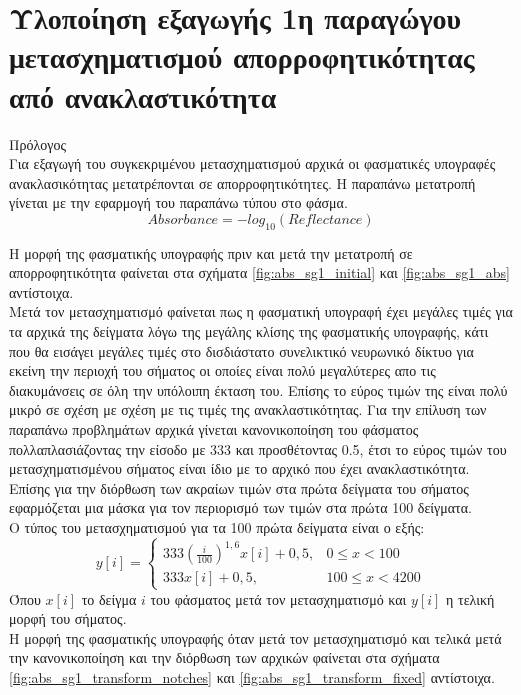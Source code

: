 \section{Υλοποίηση εξαγωγής 1η παραγώγου μετασχηματισμού  απορροφητικότητας από ανακλαστικότητα}
Πρόλογος\\
Για εξαγωγή του συγκεκριμένου μετασχηματισμού αρχικά οι φασματικές υπογραφές ανακλασικότητας μετατρέπονται σε απορροφητικότητες. Η παραπάνω μετατροπή γίνεται με την εφαρμογή του παραπάνω τύπου στο φάσμα.
$$Absorbance=-log_{10}(Reflectance)$$

Η μορφή της φασματικής υπογραφής πριν και μετά την μετατροπή σε απορροφητικότητα φαίνεται στα σχήματα \ref{fig:abs_sg1_initial} και \ref{fig:abs_sg1_abs} αντίστοιχα.\\

Μετά τον μετασχηματισμό  φαίνεται πως η φασματική υπογραφή έχει μεγάλες τιμές για τα αρχικά της δείγματα λόγω της μεγάλης κλίσης της φασματικής υπογραφής, κάτι που θα εισάγει μεγάλες τιμές στο δισδιάστατο συνελικτικό νευρωνικό δίκτυο για εκείνη την περιοχή του σήματος οι οποίες είναι πολύ μεγαλύτερες απο τις διακυμάνσεις σε όλη την υπόλοιπη έκταση του. Επίσης το εύρος τιμών της είναι πολύ μικρό σε σχέση με σχέση με τις τιμές της ανακλαστικότητας. Για την επίλυση των παραπάνω προβλημάτων αρχικά γίνεται κανονικοποίηση του φάσματος πολλαπλασιάζοντας την είσοδο με 333 και προσθέτοντας 0.5, έτσι το εύρος τιμών του μετασχηματισμένου σήματος είναι ίδιο με το αρχικό που έχει ανακλαστικότητα. Επίσης για την διόρθωση των ακραίων τιμών στα πρώτα δείγματα του σήματος εφαρμόζεται μια μάσκα για τον περιορισμό των τιμών στα πρώτα 100 δείγματα.\\
Ο τύπος του μετασχηματισμού για τα 100 πρώτα δείγματα είναι ο εξής:
\[
    y[i]= 
\begin{cases}
    333\left(\frac{i}{100}\right)^{1,6}x[i]+0,5,& 0\leq x<100\\
    333 x[i]+0,5,              & 100\leq x<4200
\end{cases}
\]
Όπου $x[i]$ το δείγμα $i$ του φάσματος μετά τον μετασχηματισμό  και $y[i]$ η τελική μορφή του σήματος.\\

Η μορφή της φασματικής υπογραφής όταν μετά τον μετασχηματισμό  και τελικά μετά την κανονικοποίηση και την διόρθωση των αρχικών φαίνεται στα σχήματα \ref{fig:abs_sg1_transform_notches} και \ref{fig:abs_sg1_transform_fixed} αντίστοιχα.\\

